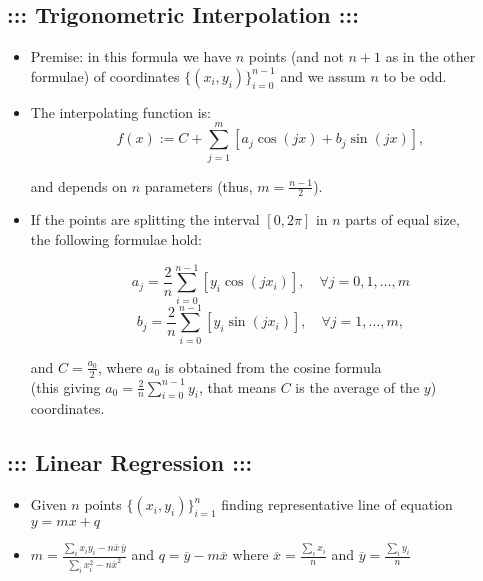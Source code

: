 \documentclass[a4paper,12pt]{amsart}
\newif\ifita
\begin{document}
\subsection*{\bf ::: \ifita Interpolazione Trigonometrica \else Trigonometric Interpolation \fi :::} 
\begin{itemize}
\item \ifita Premessa: in questa formula, ho $n$ punti (e non $n+1$ come nelle altre) di coordinate $\{(x_i,y_i)\}_{i=0}^{n-1}$ ed assumo $n$ dispari.
\else
Premise: in this formula we have $n$ points (and not $n+1$ as in the other formulae) of coordinates $\{(x_i,y_i)\}_{i=0}^{n-1}$ and we assum $n$ to be odd.
\fi
\item \ifita La funzione interpolante \`e \else The interpolating function is\fi:
$$f(x):= C + \sum_{j=1}^m \left[ a_j \cos (jx) + b_j \sin (jx) \right],$$
\ifita
e dipende da $n$ parametri (quindi $m=\frac{n-1}{2}$).
\else
and depends on $n$ parameters (thus, $m=\frac{n-1}{2}$).
\fi
\ifita
\item Se i punti di appoggio dividono l'intervallo $[0,2\pi]$ in $n$ parti uguali,\\allora valgono le seguenti formule:
\else
\item If the points are splitting the interval $[0,2\pi]$ in $n$ parts of equal size,\\the following formulae hold:
\fi
$$a_j = \frac{2}{n} \sum_{i=0}^{n-1} \left[ y_i \cos(j x_i) \right], \quad \forall j=0,1,\ldots,m$$
$$b_j = \frac{2}{n} \sum_{i=0}^{n-1} \left[ y_i \sin(j x_i) \right], \quad \forall j=1,\ldots,m,$$
\ifita
e $C=\frac{a_0}{2}$, con $a_0$ che si ricava dalla formula dei coseni (che da' semplicemente $a_0=\frac{2}{n}\sum_{i=0}^{n-1} y_i$, ovvero $C$ \`e il valore medio delle $y$).
\else
and $C=\frac{a_0}{2}$, where $a_0$ is obtained from the cosine formula\\ (this giving $a_0=\frac{2}{n}\sum_{i=0}^{n-1} y_i$, that means $C$ is the average of the $y$) coordinates.
\fi
\end{itemize}

\subsection*{\bf ::: \ifita Regressione lineare \else Linear Regression \fi :::} 
\begin{itemize}
\item \ifita Dati $n$ punti \else Given $n$ points \fi $\{(x_i,y_i)\}_{i=1}^{n}$ \ifita trovo retta rappresentativa di equazione \else finding representative line of equation \fi $y=mx+q$
\item $m=\frac{\sum_i x_i y_i - n \overline{x} \, \overline{y}}{\sum_i x_i^2 - n \overline{x}^2}$ \ifita e \else and \fi $q = \overline{y} - m \overline{x}$ \ifita con \else where \fi $\overline{x} = \frac{\sum_i x_i}{n}$ \ifita e \else and \fi $\overline{y}=\frac{\sum_i y_i}{n}$
\end{itemize}
\end{document}
